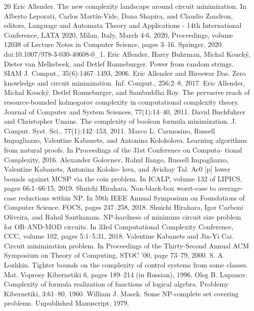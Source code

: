 \documentclass[10pt,a4paper]{article}
\begin{document}
\begin{thebibliography}{20}
Eric Allender. The new complexity landscape around circuit minimization. In Alberto Leporati, Carlos Martín-Vide, Dana Shapira, and Claudio Zandron, editors, Language and Automata Theory and Applications - 14th International Conference, LATA 2020, Milan, Italy, March 4-6, 2020, Proceedings, volume 12038 of Lecture Notes in Computer Science, pages 3–16. Springer, 2020. doi:10.1007/978-3-030-40608-0\_1.
Eric Allender, Harry Buhrman, Michal Koucký, Dieter van Melkebeek, and Detlef Ronneburger. Power from random strings. SIAM J. Comput., 35(6):1467–1493, 2006.
Eric Allender and Bireswar Das. Zero knowledge and circuit minimization. Inf. Comput., 256:2–8, 2017.
Eric Allender, Michal Koucký, Detlef Ronneburger, and Sambuddha Roy. The pervasive reach of resource-bounded kolmogorov complexity in computational complexity theory. Journal of Computer and System Sciences, 77(1):14–40, 2011.
David Buchfuhrer and Christopher Umans. The complexity of boolean formula minimization. J. Comput. Syst. Sci., 77(1):142–153, 2011.
Marco L. Carmosino, Russell Impagliazzo, Valentine Kabanets, and Antonina Kolokolova. Learning algorithms from natural proofs. In Proceedings of the 31st Conference on Computa- tional Complexity, 2016.
Alexander Golovnev, Rahul Ilango, Russell Impagliazzo, Valentine Kabanets, Antonina Koloko- lova, and Avishay Tal. Ac0 [p] lower bounds against MCSP via the coin problem. In ICALP, volume 132 of LIPICS, pages 66:1–66:15, 2019.
Shuichi Hirahara. Non-black-box worst-case to average-case reductions within NP. In 59th IEEE Annual Symposium on Foundations of Computer Science, FOCS, pages 247–258, 2018.
Shuichi Hirahara, Igor Carboni Oliveira, and Rahul Santhanam. NP-hardness of minimum circuit size problem for OR-AND-MOD circuits. In 33rd Computational Complexity Conference, CCC, volume 102, pages 5:1–5:31, 2018.
Valentine Kabanets and Jin-Yi Cai. Circuit minimization problem. In Proceedings of the Thirty-Second Annual ACM Symposium on Theory of Computing, STOC ’00, page 73–79, 2000.
S. A. Lozhkin. Tighter bounds on the complexity of control systems from some classes. Mat. Voprosy Kibernetiki 6, pages 189–214 (in Russian), 1996.
Oleg B. Lupanov. Complexity of formula realization of functions of logical algebra. Problemy Kibernetiki, 3:61–80, 1960.
William J. Masek. Some NP-complete set covering problems. Unpublished Manuscript, 1979.

\end{thebibliography}
\end{document}

